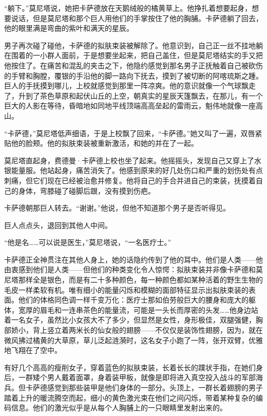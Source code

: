 \documentclass[AutoFakeBold=true]{book}
\begin{document}
``躺下。''莫尼塔说，她把卡萨德放在天鹅绒般的橘黄草上。他挣扎着想要起身，想要说话，但是莫尼塔和那个巨人用他们的手掌按住了他的胸脯。卡萨德躺了回去，他的眼里满是弯曲的紫叶和满天的星辰。

男子再次碰了碰他，卡萨德的拟肤束装被解除了。他意识到，自己正一丝不挂地躺在围着的一小群人面前，于是想要坐起来，把自己盖住，但是莫尼塔结实的手又把他按住了。在痛苦和混乱的夹击之下，他隐约感觉到那名男子正抚触着自己被砍伤的手臂和胸膛，覆银的手沿他的脚一路向下抚去，摸到了被切断的阿喀琉斯之踵。巨人的手抚摸到哪儿，上校就感觉到那里一阵凉爽。他的意识就像一个气球飘走了，升到了茶色草原和起伏山丘的上空，朝真实的星辰天篷飘去，在那儿，有一个巨大的人影在等待，昏暗地如同地平线顶端高高垒起的雷雨云，魁伟地就像一座高山。

``卡萨德，''莫尼塔低声细语，于是上校飘了回来，``卡萨德。''她又叫了一遍，双唇紧贴他的脸颊。他的拟肤束装被重新激活，和她的并在了一起。

莫尼塔直起身，费德曼·卡萨德上校也坐了起来。他摇摇头，发现自己又穿上了水银能量服。他站起身，痛苦消失了。他感到原来的好几处伤口和严重的划伤处有点刺痛，但它们现在已经被治愈并修复。他将自己的手合并进自己的束装，抚摸着自己的身体，弯膝碰了碰脚后跟，没有摸到伤疤。

卡萨德朝那巨人转去。``谢谢。''他说，但他不知道那个男子是否听得见。

巨人点点头，退回到其他人中间。

``他是名……可以说是医生，''莫尼塔说，``一名医疗士。''

卡萨德正全神贯注在其他人身上，她的话隐约传到了他的耳中。他们是人类——他由衷感到他们是人类——但他们的种类变化令人惊愕：拟肤束装并非像卡萨德和莫尼塔那样全是银色，而是有二十多种颜色，每一种颜色都如某种活着的野生生物的毛皮一样柔软有机。唯有细小的能量闪烁和模糊的面部特征显示出拟肤束装的表面。他们的体格同色调一样千变万化：医疗士那如伯劳般巨大的腰身和庞大的躯体，宽厚的眉毛和一连串茶色的能量流，可能是一头长而厚密的头发……他身边站着一名女子，虽然比小女孩大不了多少，但显然是女性，身形极佳，双腿强健，胸部娇小，背上竖立着两米长的仙女般的翅膀——不仅仅是装饰性翅膀，因为，就在微风拂过橘黄的大草原，草儿泛起涟漪时，这名女子小跑了一阵，张开双臂，优雅地飞翔在了空中。

有好几个高高的瘦削女子，穿着蓝色的拟肤束装，长着长长的蹼状手指，在她们身后，一群矮个男人戴着面罩，身着装甲板，就像是即将进入真空投入战斗的军部海兵。但卡萨德感觉到那些装甲是他们身体的一部分。头顶上，一群长着翅膀的男子踏着上升的暖流腾空而起，细小的黄色激光束在他们之间闪烁，带着某种复杂的编码信息。他们的激光似乎是从每个人胸脯上的一只眼睛里发射出来的。
\end{document}
